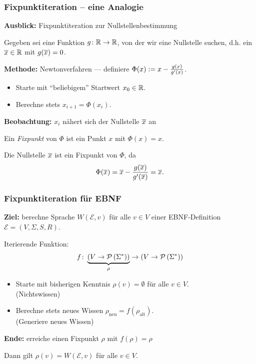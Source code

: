 \documentclass{beamer}
\begin{document}
\begin{frame} \frametitle{Fixpunktiteration -- eine Analogie}
	\small
	\textbf{Ausblick:} Fixpunktiteration zur Nullstellenbestimmung
	
	Gegeben sei eine Funktion $g \colon \mathbb{R} \to \mathbb{R}$, von der wir eine Nullstelle suchen, d.h. ein $\overline{x} \in \mathbb{R}$ mit $g(\overline{x}) = 0$.
	
	\pause
	\textbf{Methode:} Newtonverfahren --- definiere $\Phi(x) \mathrel{:=} x - \frac{g(x)}{g'(x)}$.
	\begin{itemize}
		\item Starte mit \enquote{beliebigem} Startwert $x_0 \in \mathbb{R}$.
		\item Berechne stets $x_{i+1} = \Phi(x_i)$.
	\end{itemize}

	\pause
	\textbf{Beobachtung:} $x_{i}$ nähert sich der Nullstelle $\overline{x}$ an
	
	\pause
	Ein \textit{Fixpunkt} von $\Phi$ ist ein Punkt $x$ mit $\Phi(x) = x$.
	
	\pause
	Die Nullstelle $\overline{x}$ ist ein Fixpunkt von $\Phi$, da
	\begin{equation*}
		\Phi(\overline{x}) = \overline{x} - \frac{g(\overline{x})}{g'(\overline{x})} = \overline{x} .
	\end{equation*} 
\end{frame}

\begin{frame} \frametitle{Fixpunktiteration für EBNF}
	\small
	\textbf{Ziel:} berechne Sprache $W(\mathcal{E}, v)$ für alle $v \in V$ einer EBNF-Definition $\mathcal{E} = (V, \Sigma, S, R)$.
	
	\pause
	Iterierende Funktion:
	\begin{equation*}
		f \colon \underbrace{\left( V \to \mathcal{P}\left( \Sigma^\ast \right) \right)}_{\rho} \to \left( V \to \mathcal{P}\left( \Sigma^\ast \right) \right)
	\end{equation*}
	
	\begin{itemize}
		\item Starte mit bisherigen Kenntnis $\rho(v) = \emptyset$ für alle $v \in V$. \\
		(Nichtswissen)
		\item Berechne stets neues Wissen $\rho_{\text{neu}} = f(\rho_{\text{alt}})$. \\
		(Generiere neues Wissen)
	\end{itemize}

	\pause
	\textbf{Ende:} erreiche einen Fixpunkt $\rho$ mit $f(\rho) = \rho$
	
	Dann gilt $\rho(v) = W(\mathcal{E}, v)$ für alle $v \in V$.
\end{frame}
\end{document}
